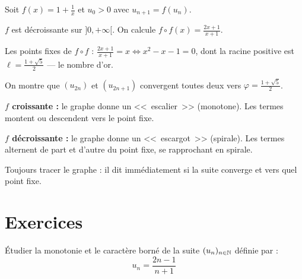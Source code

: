 \begin{exbox}
Soit $f(x) = 1 + \frac{1}{x}$ et $u_0 > 0$ avec $u_{n+1} = f(u_n)$.

$f$ est décroissante sur $]0, +\infty[$. On calcule $f \circ f(x) = \frac{2x+1}{x+1}$.

Les points fixes de $f \circ f$ : $\frac{2x+1}{x+1} = x \Leftrightarrow x^2 - x - 1 = 0$, dont la racine positive est $\ell = \frac{1 + \sqrt{5}}{2}$ --- le nombre d'or.

On montre que $(u_{2n})$ et $(u_{2n+1})$ convergent toutes deux vers $\varphi = \frac{1+\sqrt{5}}{2}$.
\end{exbox}

\begin{intuitionbox}
\textbf{$f$ croissante :} le graphe donne un <<~escalier~>> (monotone). Les termes montent ou descendent vers le point fixe.

\textbf{$f$ décroissante :} le graphe donne un <<~escargot~>> (spirale). Les termes alternent de part et d'autre du point fixe, se rapprochant en spirale.

Toujours tracer le graphe : il dit immédiatement si la suite converge et vers quel point fixe.
\end{intuitionbox}


\section{Exercices}

\begin{exbox}
Étudier la monotonie et le caractère borné de la suite $(u_n)_{n \in \mathbb{N}}$ définie par :
\[
  u_n = \frac{2n-1}{n+1}
\]
\end{exbox}

